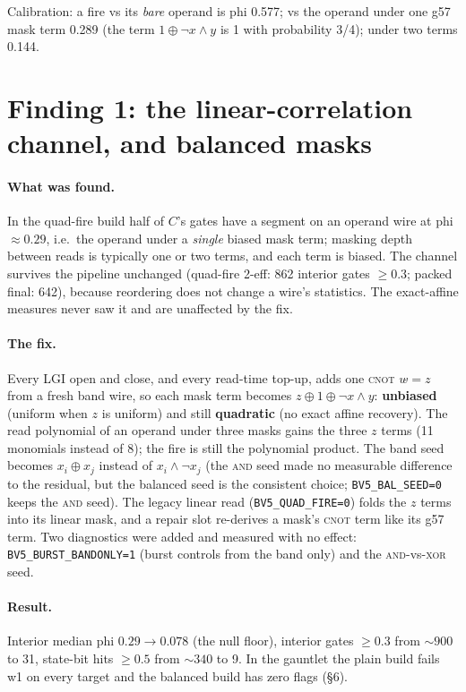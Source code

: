 \documentclass[11pt]{article}
\newcommand{\xor}{\oplus}
\newcommand{\doc}[1]{\texttt{#1}}
\newcommand{\g}{\textsf{g57}}
\begin{document}
Calibration: a fire vs its \emph{bare} operand is phi 0.577; vs the operand under one \g{}
mask term 0.289 (the term $1\xor\neg x{\wedge}y$ is 1 with probability 3/4); under two terms
0.144.

\section{Finding 1: the linear-correlation channel, and balanced masks}

\paragraph{What was found.} In the quad-fire build half of $C$'s gates have a segment on an
operand wire at phi ${\approx}0.29$, i.e.\ the operand under a \emph{single} biased mask
term; masking depth between reads is typically one or two terms, and each term is biased.
The channel survives the pipeline unchanged (quad-fire 2-eff: 862 interior gates $\ge0.3$;
packed final: 642), because reordering does not change a wire's statistics. The exact-affine
measures never saw it and are unaffected by the fix.

\paragraph{The fix.} Every LGI open and close, and every read-time top-up, adds one
\textsc{cnot} $w \mathrel{\hat{}}= z$ from a fresh band wire, so each mask term becomes
$z\xor1\xor\neg x{\wedge}y$: \textbf{unbiased} (uniform when $z$ is uniform) and still
\textbf{quadratic} (no exact affine recovery). The read polynomial of an operand under three
masks gains the three $z$ terms (11 monomials instead of 8); the fire is still the polynomial
product. The band seed becomes $x_i\xor x_j$ instead of $x_i\wedge\neg x_j$ (the \textsc{and}
seed made no measurable difference to the residual, but the balanced seed is the consistent
choice; \doc{BV5\_BAL\_SEED=0} keeps the \textsc{and} seed). The legacy linear read
(\doc{BV5\_QUAD\_FIRE=0}) folds the $z$ terms into its linear mask, and a repair slot
re-derives a mask's \textsc{cnot} term like its \g{} term. Two diagnostics were added and
measured with no effect: \doc{BV5\_BURST\_BANDONLY=1} (burst controls from the band only)
and the \textsc{and}-vs-\textsc{xor} seed.

\paragraph{Result.} Interior median phi $0.29\to0.078$ (the null floor), interior gates
$\ge0.3$ from ${\sim}900$ to 31, state-bit hits $\ge0.5$ from ${\sim}340$ to 9. In the gauntlet
the plain build fails w1 on every target and the balanced build has zero flags (\S6).
\end{document}
